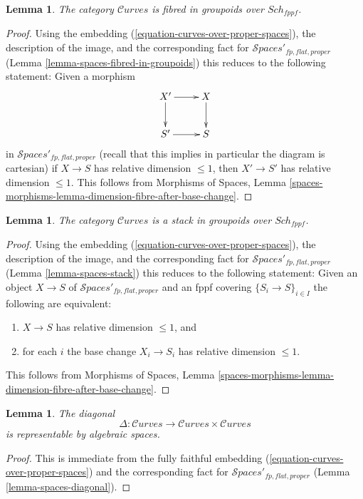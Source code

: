 \documentclass{stacks-project}
\theoremstyle{plain}
\newtheorem{lemma}[subsection]{Lemma}
\theoremstyle{definition}
\theoremstyle{remark}
\numberwithin{equation}{subsection}
\def\Sch{\mathit{Sch}}
\def\Spacesstack{\mathcal{S}\!\mathit{paces}}
\def\Curvesstack{\mathcal{C}\!\mathit{urves}}
\begin{document}
\begin{lemma}
\label{lemma-curves-fibred-in-groupoids}
The category $\Curvesstack$ is fibred in groupoids over $\Sch_{fppf}$.
\end{lemma}

\begin{proof}
Using the embedding (\ref{equation-curves-over-proper-spaces}),
the description of the image, and
the corresponding fact for $\Spacesstack'_{fp, flat, proper}$
(Lemma \ref{lemma-spaces-fibred-in-groupoids})
this reduces to the following statement: Given a morphism
$$
\xymatrix{
X' \ar[r] \ar[d] & X \ar[d] \\
S' \ar[r] & S
}
$$
in $\Spacesstack'_{fp, flat, proper}$ (recall that this implies
in particular the diagram is cartesian)
if $X \to S$ has relative dimension $\leq 1$, then $X' \to S'$
has relative dimension $\leq 1$.
This follows from Morphisms of Spaces, Lemma
\ref{spaces-morphisms-lemma-dimension-fibre-after-base-change}.
\end{proof}

\begin{lemma}
\label{lemma-curves-stack}
The category $\Curvesstack$ is a stack in groupoids over $\Sch_{fppf}$.
\end{lemma}

\begin{proof}
Using the embedding (\ref{equation-curves-over-proper-spaces}),
the description of the image, and
the corresponding fact for $\Spacesstack'_{fp, flat, proper}$
(Lemma \ref{lemma-spaces-stack})
this reduces to the following statement: Given an object
$X \to S$ of $\Spacesstack'_{fp, flat, proper}$
and an fppf covering $\{S_i \to S\}_{i \in I}$
the following are equivalent:
\begin{enumerate}
\item $X \to S$ has relative dimension $\leq 1$, and
\item for each $i$ the base change $X_i \to S_i$
has relative dimension $\leq 1$.
\end{enumerate}
This follows from Morphisms of Spaces, Lemma
\ref{spaces-morphisms-lemma-dimension-fibre-after-base-change}.
\end{proof}

\begin{lemma}
\label{lemma-curves-diagonal}
The diagonal
$$
\Delta : \Curvesstack \longrightarrow \Curvesstack \times \Curvesstack
$$
is representable by algebraic spaces.
\end{lemma}

\begin{proof}
This is immediate from the fully faithful embedding
(\ref{equation-curves-over-proper-spaces}) and
the corresponding fact for $\Spacesstack'_{fp, flat, proper}$
(Lemma \ref{lemma-spaces-diagonal}).
\end{proof}
\end{document}
